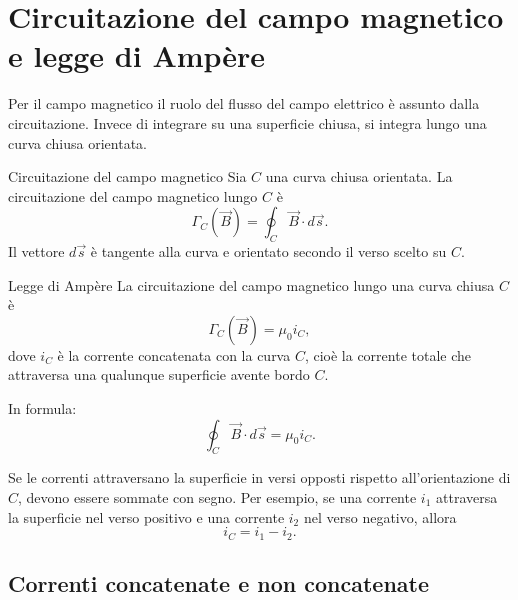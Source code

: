 \documentclass[a4paper]{article}
\begin{document}
\section{Circuitazione del campo magnetico e legge di Ampère}

Per il campo magnetico il ruolo del flusso del campo elettrico è assunto dalla circuitazione. Invece di integrare su una superficie chiusa, si integra lungo una curva chiusa orientata.

\begin{snippetdefinition}{Circuitazione del campo magnetico}
    Sia \(C\) una curva chiusa orientata. La circuitazione del campo magnetico lungo \(C\) è
    \[
        \Gamma_C(\vec{B})=\oint_C \vec{B}\cdot d\vec{s}.
    \]
    Il vettore \(d\vec{s}\) è tangente alla curva e orientato secondo il verso scelto su \(C\).
\end{snippetdefinition}

\begin{snippettheorem}{Legge di Ampère}
    La circuitazione del campo magnetico lungo una curva chiusa \(C\) è
    \[
        \Gamma_C(\vec{B})=\mu_0 i_C,
    \]
    dove \(i_C\) è la corrente concatenata con la curva \(C\), cioè la corrente totale che attraversa una qualunque superficie avente bordo \(C\).
\end{snippettheorem}

In formula:
\[
    \oint_C \vec{B}\cdot d\vec{s}=\mu_0 i_C.
\]

Se le correnti attraversano la superficie in versi opposti rispetto all'orientazione di \(C\), devono essere sommate con segno. Per esempio, se una corrente \(i_1\) attraversa la superficie nel verso positivo e una corrente \(i_2\) nel verso negativo, allora
\[
    i_C=i_1-i_2.
\]

\begin{center}
\end{center}

\subsection{Correnti concatenate e non concatenate}
\end{document}
